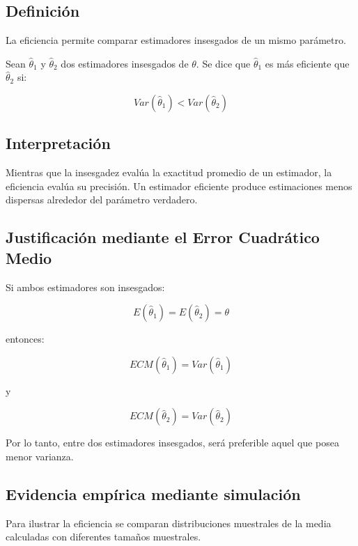 \documentclass[
  11pt,
]{report}
\begin{document}
\subsection{Definición}\label{definiciuxf3n-1}

La eficiencia permite comparar estimadores insesgados de un mismo
parámetro.

Sean \(\hat{\theta}_1\) y \(\hat{\theta}_2\) dos estimadores insesgados
de \(\theta\). Se dice que \(\hat{\theta}_1\) es más eficiente que
\(\hat{\theta}_2\) si:

\[Var(\hat{\theta}_1)
<
Var(\hat{\theta}_2)\]

\subsection{Interpretación}\label{interpretaciuxf3n-2}

Mientras que la insesgadez evalúa la exactitud promedio de un estimador,
la eficiencia evalúa su precisión. Un estimador eficiente produce
estimaciones menos dispersas alrededor del parámetro verdadero.

\subsection{Justificación mediante el Error Cuadrático
Medio}\label{justificaciuxf3n-mediante-el-error-cuadruxe1tico-medio}

Si ambos estimadores son insesgados:

\[E(\hat{\theta}_1)
=
E(\hat{\theta}_2)
=
\theta\]

entonces:

\[ECM(\hat{\theta}_1)
=
Var(\hat{\theta}_1)\]

y

\[ECM(\hat{\theta}_2)
=
Var(\hat{\theta}_2)\]

Por lo tanto, entre dos estimadores insesgados, será preferible aquel
que posea menor varianza.

\subsection{Evidencia empírica mediante
simulación}\label{evidencia-empuxedrica-mediante-simulaciuxf3n-1}

Para ilustrar la eficiencia se comparan distribuciones muestrales de la
media calculadas con diferentes tamaños muestrales.
\end{document}
